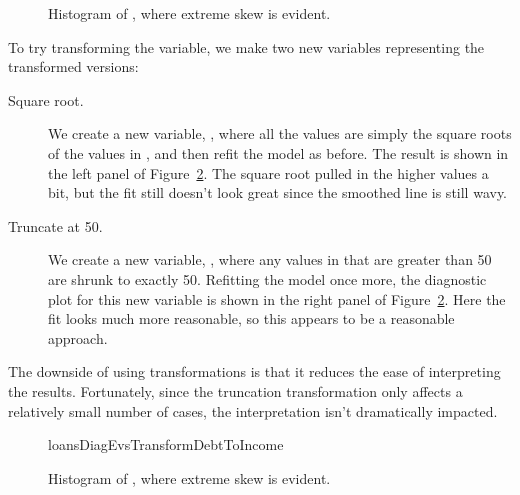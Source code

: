 \begin{figure}[h]
  \centering
  \caption{Histogram of ,
      where extreme skew is evident.}
  \label{loansDebtToIncomeHist}
\end{figure}

To try transforming the variable, we make two new variables
representing the transformed versions:
\begin{description}
\item[Square root.]
    We create a new variable,
    ,
    where all the values are simply the square roots of the
    values in ,
    and then refit the model as before.
    The result is shown in the left panel of
    Figure~\ref{loansDiagEvsTransformDebtToIncome}.
    The square root pulled in the higher values
    a bit, but the fit still doesn't look great
    since the smoothed line is still wavy.
\item[Truncate at 50.]
    We create a new variable,
    ,
    where any values in 
    that are greater than 50 are shrunk to exactly 50.
    Refitting the model once more,
    the diagnostic plot for this new variable is shown
    in the right panel of
    Figure~\ref{loansDiagEvsTransformDebtToIncome}.
    Here the fit looks much more reasonable,
    so this appears to be a reasonable approach.
\end{description}
The downside of using transformations is that it reduces
the ease of interpreting the results.
Fortunately, since the truncation transformation only affects
a relatively small number of cases, the interpretation
isn't dramatically impacted.

\begin{figure}[h]
  \centering
      {loansDiagEvsTransformDebtToIncome}
  \caption{Histogram of ,
      where extreme skew is evident.}
  \label{loansDiagEvsTransformDebtToIncome}
\end{figure}

